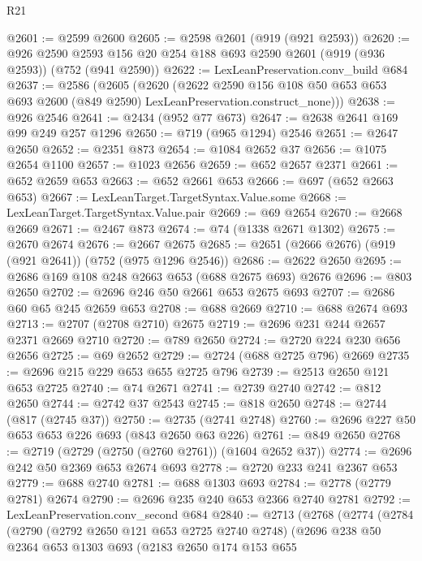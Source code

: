 \begin{lexlean}{R21}
\begin{coremodule}
@2601 := @2599 @2600
@2605 := @2598 @2601 (@919 (@921 @2593))
@2620 := @926
    @2590
    @2593
    @156
    @20
    @254
    @188
    @693
    @2590
    @2601
    (@919 (@936 @2593))
    (@752 (@941 @2590))
@2622 := LexLeanPreservation.conv_build @684
@2637 := @2586
    (@2605
      (@2620
        (@2622
          @2590
          @156
          @108
          @50
          @653
          @653
          @693
          @2600
          (@849 @2590)
          LexLeanPreservation.construct_none)))
@2638 := @926 @2546
@2641 := @2434 (@952 @77 @673)
@2647 := @2638 @2641 @169 @99 @249 @257 @1296
@2650 := @719 (@965 @1294) @2546
@2651 := @2647 @2650
@2652 := @2351 @873
@2654 := @1084 @2652 @37
@2656 := @1075 @2654 @1100
@2657 := @1023 @2656
@2659 := @652 @2657 @2371
@2661 := @652 @2659 @653
@2663 := @652 @2661 @653
@2666 := @697 (@652 @2663 @653)
@2667 := LexLeanTarget.TargetSyntax.Value.some
@2668 := LexLeanTarget.TargetSyntax.Value.pair
@2669 := @69 @2654
@2670 := @2668 @2669
@2671 := @2467 @873
@2674 := @74 (@1338 @2671 @1302)
@2675 := @2670 @2674
@2676 := @2667 @2675
@2685 := @2651 (@2666 @2676) (@919 (@921 @2641)) (@752 (@975 @1296 @2546))
@2686 := @2622 @2650
@2695 := @2686 @169 @108 @248 @2663 @653 (@688 @2675 @693) @2676
@2696 := @803 @2650
@2702 := @2696 @246 @50 @2661 @653 @2675 @693
@2707 := @2686 @60 @65 @245 @2659 @653
@2708 := @688 @2669
@2710 := @688 @2674 @693
@2713 := @2707 (@2708 @2710) @2675
@2719 := @2696 @231 @244 @2657 @2371 @2669 @2710
@2720 := @789 @2650
@2724 := @2720 @224 @230 @656 @2656
@2725 := @69 @2652
@2729 := @2724 (@688 @2725 @796) @2669
@2735 := @2696 @215 @229 @653 @655 @2725 @796
@2739 := @2513 @2650 @121 @653 @2725
@2740 := @74 @2671
@2741 := @2739 @2740
@2742 := @812 @2650
@2744 := @2742 @37 @2543
@2745 := @818 @2650
@2748 := @2744 (@817 (@2745 @37))
@2750 := @2735 (@2741 @2748)
@2760 := @2696 @227 @50 @653 @653 @226 @693 (@843 @2650 @63 @226)
@2761 := @849 @2650
@2768 := @2719 (@2729 (@2750 (@2760 @2761)) (@1604 @2652 @37))
@2774 := @2696 @242 @50 @2369 @653 @2674 @693
@2778 := @2720 @233 @241 @2367 @653
@2779 := @688 @2740
@2781 := @688 @1303 @693
@2784 := @2778 (@2779 @2781) @2674
@2790 := @2696 @235 @240 @653 @2366 @2740 @2781
@2792 := LexLeanPreservation.conv_second @684
@2840 := @2713
    (@2768
      (@2774
        (@2784
          (@2790
            (@2792 @2650 @121 @653 @2725 @2740 @2748)
            (@2696
              @238
              @50
              @2364
              @653
              @1303
              @693
              (@2183
                @2650
                @174
                @153
                @655

\end{coremodule}
\end{lexlean}
